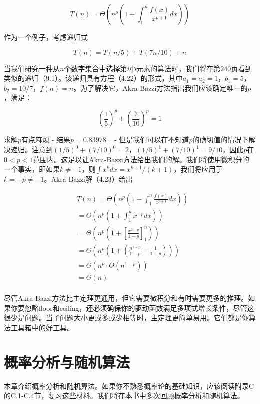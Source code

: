 \documentclass[lang=cn,newtx,10pt,scheme=chinese]{elegantbook}
\begin{document}
\begin{equation}
T(n)=\Theta\left(n^p\left(1+\int_1^n \frac{f(x)}{x^{p+1}} d x\right)\right)
\end{equation}

作为一个例子，考虑递归式

\begin{equation}
T(n)=T(n / 5)+T(7 n / 10)+n
\end{equation}

当我们研究一种从$n$个数字集合中选择第$i$小元素的算法时，我们将在第240页看到类似的递归（9.1）。该递归具有方程（4.22）的形式，其中$a_1=a_2=1$，$b_1=5$，$b_2=10/7$，$f(n)=n$。为了解决它，Akra-Bazzi方法指出我们应该确定唯一的$p$，满足：

$$
\left(\frac{1}{5}\right)^p+\left(\frac{7}{10}\right)^p=1
$$

求解$p$有点麻烦 - 结果$p=0.83978 \ldots$ - 但是我们可以在不知道$p$的确切值的情况下解决递归。注意到$(1 / 5)^0+(7 / 10)^0=2$，$(1 / 5)^1+(7 / 10)^1=9 / 10$，因此$p$在$0<p<1$范围内。这足以让Akra-Bazzi方法给出我们的解。我们将使用微积分的一个事实，即如果$k \neq-1$，则$\int x^k d x=x^{k+1} /(k+1)$，我们将应用于$k=-p \neq-1$。Akra-Bazzi解（4.23）给出

$$
\begin{aligned}
& T(n)=\Theta\left(n^p\left(1+\int_1^n \frac{f(x)}{x^{p+1}} d x\right)\right) \\
& =\Theta\left(n^p\left(1+\int_1^n x^{-p} d x\right)\right) \\
& =\Theta\left(n^p\left(1+\left[\frac{x^{1-p}}{1-p}\right]_1^n\right)\right) \\
& =\Theta\left(n^p\left(1+\left(\frac{n^{1-p}}{1-p}-\frac{1}{1-p}\right)\right)\right) \\
& =\Theta\left(n^p \cdot \Theta\left(n^{1-p}\right)\right) \\
& =\Theta(n) \\
&
\end{aligned}
$$

尽管Akra-Bazzi方法比主定理更通用，但它需要微积分和有时需要更多的推理。如果你要忽略floor和ceiling，还必须确保你的驱动函数满足多项式增长条件，尽管这很少是问题。当子问题大小更或多或少相等时，主定理更简单易用。它们都是你算法工具箱中的好工具。

\chapter{概率分析与随机算法}

本章介绍概率分析和随机算法。如果你不熟悉概率论的基础知识，应该阅读附录C的C.1-C.4节，复习这些材料。我们将在本书中多次回顾概率分析和随机算法。
\end{document}
